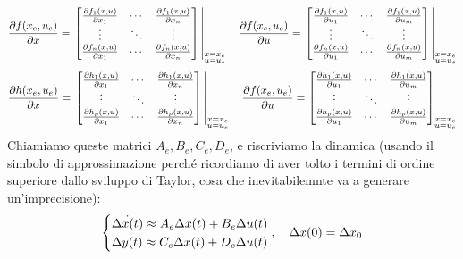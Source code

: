 \documentclass[a4paper]{report}
\begin{document}
\begin{align*}
	\pdv{f(x_e, u_e)}{x} = \eval{\begin{bmatrix}
		\pdv{f_1(x, u)}{x_1} & \cdots	& \pdv{f_1(x, u)}{x_n} \\
		\vdots & \ddots & \vdots \\
	\pdv{f_n(x, u)}{x_1} & \cdots & \pdv{f_n(x, u)}{x_n}
	\end{bmatrix}}_{\substack{x=x_e \\ u=u_e}} 
	\quad 
	\pdv{f(x_e, u_e)}{u} = \eval{\begin{bmatrix}
	\pdv{f_1(x, u)}{u_1} & \cdots & 	\pdv{f_1(x, u)}{u_m} \\
		\vdots & \ddots & \vdots \\
	\pdv{f_n(x, u)}{u_1} & \cdots &		\pdv{f_n(x, u)}{u_m}
	\end{bmatrix}}_{\substack{x=x_e \\ u=u_e}} 
\end{align*}
\begin{align*}
	\pdv{h(x_e, u_e)}{x} = \eval{\begin{bmatrix}
		\pdv{h_1(x, u)}{x_1} & \cdots	& \pdv{h_1(x, u)}{x_n} \\
		\vdots & \ddots & \vdots \\
	\pdv{h_p(x, u)}{x_1} & \cdots & 		\pdv{h_p(x, u)}{x_n}
	\end{bmatrix}}_{\substack{x=x_e \\ u=u_e}}  \quad 
	\pdv{f(x_e, u_e)}{u} = \begin{bmatrix}
	\pdv{h_1(x, u)}{u_1} & \cdots & 	\pdv{h_1(x, u)}{u_m} \\
		\vdots & \ddots & \vdots \\
	\pdv{h_p(x, u)}{u_1} & \cdots &		\pdv{h_p(x, u)}{u_m}
	\end{bmatrix}_{\substack{x=x_e \\ u=u_e}} 
\end{align*}
Chiamiamo queste matrici $A_e, B_e, C_e, D_e$, e riscriviamo la dinamica (usando il simbolo di approssimazione perché ricordiamo di aver tolto i termini di ordine superiore dallo sviluppo di Taylor, cosa che inevitabilemnte va a generare un'imprecisione):
\begin{align*}
	\begin{dcases}
		\dot{\Delta x(t)} \approx A_e \Delta x(t) + B_e \Delta u(t) \\
		\Delta y(t) \approx C_e \Delta x(t) + D_e \Delta u(t) 
	\end{dcases}, \quad \Delta x(0) = \Delta x_0
\end{align*}
\end{document}
